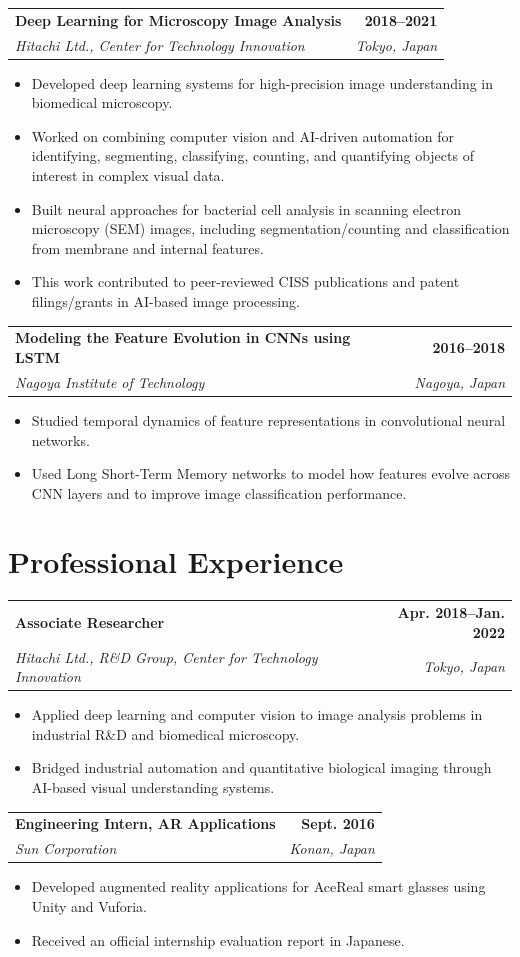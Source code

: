 \documentclass[11pt,a4paper]{article}
\makeatletter
\newcommand{\entry}[4]{%
  \begin{tabularx}{\linewidth}{@{}>{\raggedright\arraybackslash}X r@{}}
    \textbf{#1} & \textbf{#2} \\
    \textit{#3} & \textit{#4}
  \end{tabularx}\vspace{-2pt}
}
\makeatother
\begin{document}
\entry{Deep Learning for Microscopy Image Analysis}{2018--2021}{Hitachi Ltd., Center for Technology Innovation}{Tokyo, Japan}
\begin{itemize}
  \item Developed deep learning systems for high-precision image understanding in biomedical microscopy.
  \item Worked on combining computer vision and AI-driven automation for identifying, segmenting, classifying, counting, and quantifying objects of interest in complex visual data.
  \item Built neural approaches for bacterial cell analysis in scanning electron microscopy (SEM) images, including segmentation/counting and classification from membrane and internal features.
  \item This work contributed to peer-reviewed CISS publications and patent filings/grants in AI-based image processing.
\end{itemize}

\entry{Modeling the Feature Evolution in CNNs using LSTM}{2016--2018}{Nagoya Institute of Technology}{Nagoya, Japan}
\begin{itemize}
  \item Studied temporal dynamics of feature representations in convolutional neural networks.
  \item Used Long Short-Term Memory networks to model how features evolve across CNN layers and to improve image classification performance.
\end{itemize}

\section*{Professional Experience}
\entry{Associate Researcher}{Apr. 2018--Jan. 2022}{Hitachi Ltd., R\&D Group, Center for Technology Innovation}{Tokyo, Japan}
\begin{itemize}
  \item Applied deep learning and computer vision to image analysis problems in industrial R\&D and biomedical microscopy.
  \item Bridged industrial automation and quantitative biological imaging through AI-based visual understanding systems.
\end{itemize}

\entry{Engineering Intern, AR Applications}{Sept. 2016}{Sun Corporation}{Konan, Japan}
\begin{itemize}
  \item Developed augmented reality applications for AceReal smart glasses using Unity and Vuforia.
  \item Received an official internship evaluation report in Japanese.
\end{itemize}
\end{document}
